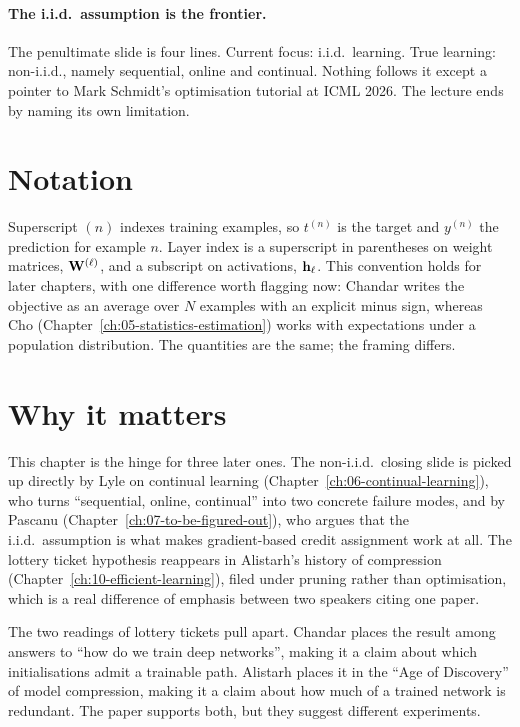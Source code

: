 \paragraph{The i.i.d.\ assumption is the frontier.} The penultimate slide is four lines.
Current focus: i.i.d.\ learning. True learning: non-i.i.d., namely sequential, online and
continual. Nothing follows it except a pointer to Mark Schmidt's optimisation tutorial at
ICML 2026. The lecture ends by naming its own limitation.

\section*{Notation}

Superscript $(n)$ indexes training examples, so $t^{(n)}$ is the target and $y^{(n)}$ the
prediction for example $n$. Layer index is a superscript in parentheses on weight matrices,
$\mathbf{W}^{(\ell)}$, and a subscript on activations, $\mathbf{h}_\ell$. This convention
holds for later chapters, with one difference worth flagging now:
Chandar writes the objective as an average over $N$ examples with an explicit minus sign,
whereas Cho (Chapter~\ref{ch:05-statistics-estimation}) works with expectations under a
population distribution. The quantities are the same; the framing differs.

\section*{Why it matters}

This chapter is the hinge for three later ones. The non-i.i.d.\ closing slide is picked up
directly by Lyle on continual learning (Chapter~\ref{ch:06-continual-learning}), who turns
``sequential, online, continual'' into two concrete failure modes, and by Pascanu
(Chapter~\ref{ch:07-to-be-figured-out}), who argues that the i.i.d.\ assumption is what
makes gradient-based credit assignment work at all. The lottery ticket hypothesis reappears
in Alistarh's history of compression (Chapter~\ref{ch:10-efficient-learning}), filed under
pruning rather than optimisation, which is a real difference of emphasis between two
speakers citing one paper.

\begin{aside}
The two readings of lottery tickets pull apart. Chandar places the result among
answers to ``how do we train deep networks'', making it a claim about which initialisations
admit a trainable path. Alistarh places it in the ``Age of Discovery'' of model compression,
making it a claim about how much of a trained network is redundant. The paper supports both,
but they suggest different experiments.
\end{aside}
